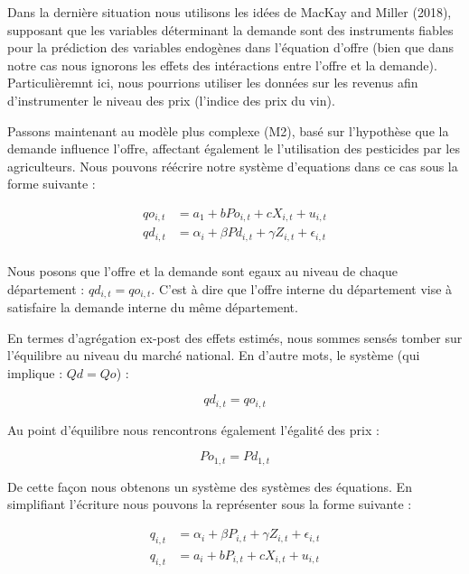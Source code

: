 \documentclass[11pt,]{article}
\begin{document}
Dans la dernière situation nous utilisons les idées de MacKay and Miller
(2018), supposant que les variables déterminant la demande sont des
instruments fiables pour la prédiction des variables endogènes dans
l'équation d'offre (bien que dans notre cas nous ignorons les effets des
intéractions entre l'offre et la demande). Particulièremnt ici, nous
pourrions utiliser les données sur les revenus afin d'instrumenter le
niveau des prix (l'indice des prix du vin).

Passons maintenant au modèle plus complexe (M2), basé sur l'hypothèse
que la demande influence l'offre, affectant également le l'utilisation
des pesticides par les agriculteurs. Nous pouvons réécrire notre système
d'equations dans ce cas sous la forme suivante :

\begin{align*}
  qo_{i,t} & = a_1 + b Po_{i,t} + c X_{i,t} + u_{i,t} \\ 
  qd_{i,t} & = \alpha_{i} + \beta Pd_{i,t} + \gamma Z_{i,t} + \epsilon_{i,t}  \\
\end{align*}

Nous posons que l'offre et la demande sont egaux au niveau de chaque
département : \(qd_{i,t} = qo_{i,t}\). C'est à dire que l'offre interne
du département vise à satisfaire la demande interne du même département.

En termes d'agrégation ex-post des effets estimés, nous sommes sensés
tomber sur l'équilibre au niveau du marché national. En d'autre mots, le
système (qui implique : \(Qd = Qo\)) :

\begin{equation*}
  qd_{i,t} = qo_{i,t}
\end{equation*}

Au point d'équilibre nous rencontrons également l'égalité des prix :

\begin{equation*}
  Po_{1,t} = Pd_{1,t}
\end{equation*}

De cette façon nous obtenons un système des systèmes des équations. En
simplifiant l'écriture nous pouvons la représenter sous la forme
suivante :

\begin{align*}
  q_{i,t} & = \alpha_{i} + \beta P_{i,t} + \gamma Z_{i,t} + \epsilon_{i,t} \\
  q_{i,t} & = a_i + b P_{i,t} + c X_{i,t} + u_{i,t}
\end{align*}
\end{document}
